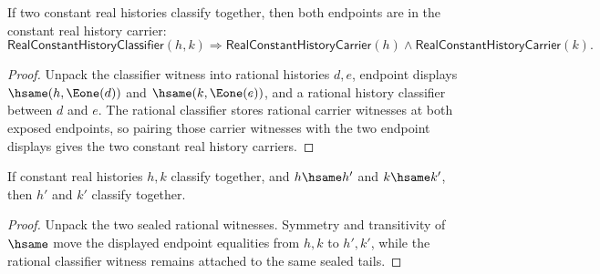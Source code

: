 \begin{theorem}
\label{thm:real-constant-history-classifier-endpoint-carriers}
If two constant real histories classify together, then both endpoints are in the
constant real history carrier:
$$
\mathsf{RealConstantHistoryClassifier}(h,k)
\Longrightarrow
\mathsf{RealConstantHistoryCarrier}(h)\land
\mathsf{RealConstantHistoryCarrier}(k).
$$
\end{theorem}
\begin{proof}
Unpack the classifier witness into rational histories $d,e$, endpoint displays
$\hsame(h,\Eone(d))$ and $\hsame(k,\Eone(e))$, and a rational history
classifier between $d$ and $e$. The rational classifier stores rational carrier
witnesses at both exposed endpoints, so pairing those carrier witnesses with the
two endpoint displays gives the two constant real history carriers.
\end{proof}

\begin{theorem}
\label{thm:real-constant-history-classifier-endpoint-transport}
If constant real histories $h,k$ classify together, and $h\hsame h'$ and
$k\hsame k'$, then $h'$ and $k'$ classify together.
\end{theorem}
\begin{proof}
Unpack the two sealed rational witnesses. Symmetry and transitivity of
$\hsame$ move the displayed endpoint equalities from $h,k$ to $h',k'$, while
the rational classifier witness remains attached to the same sealed tails.
\end{proof}

